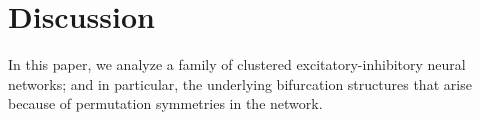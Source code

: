 \documentclass[reqno]{siamonline190516}
\newcommand{\Hvec}{\mathbf{H}}
\begin{document}

\section{Discussion}
In this paper, we analyze a family of clustered excitatory-inhibitory neural networks; and in particular, the underlying bifurcation structures that arise because of permutation symmetries in the network. 
\end{document}
